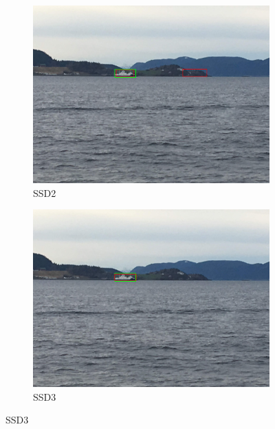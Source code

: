\begin{figure}[h!]
\begin{subfigure}{.5\textwidth}
  \centering
  \includegraphics[width=0.75\linewidth]{results/case_buildings/ssdtrf/ssd2/grov2/IMG_2285.jpg}
  \caption{SSD2}
\end{subfigure}%
\begin{subfigure}{.5\textwidth}
  \centering
  \includegraphics[width=.75\linewidth]{results/case_buildings/ssdtrf/ssd3/grov2/IMG_2285.jpg}
  \caption{SSD3}
\end{subfigure}


\end{figure}
